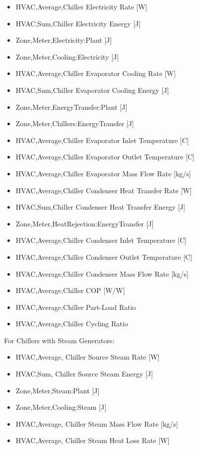 \begin{itemize}
    \item
    HVAC,Average,Chiller Electricity Rate {[}W{]}
    \item
    HVAC,Sum,Chiller Electricity Energy {[}J{]}
    \item
    Zone,Meter,Electricity:Plant {[}J{]}
    \item
    Zone,Meter,Cooling:Electricity {[}J{]}
    \item
    HVAC,Average,Chiller Evaporator Cooling Rate {[}W{]}
    \item
    HVAC,Sum,Chiller Evaporator Cooling Energy {[}J{]}
    \item
    Zone,Meter,EnergyTransfer:Plant {[}J{]}
    \item
    Zone,Meter,Chillers:EnergyTransfer {[}J{]}
    \item
    HVAC,Average,Chiller Evaporator Inlet Temperature {[}C{]}
    \item
    HVAC,Average,Chiller Evaporator Outlet Temperature {[}C{]}
    \item
    HVAC,Average,Chiller Evaporator Mass Flow Rate {[}kg/s{]}
    \item
    HVAC,Average,Chiller Condenser Heat Transfer Rate {[}W{]}
    \item
    HVAC,Sum,Chiller Condenser Heat Transfer Energy {[}J{]}
    \item
    Zone,Meter,HeatRejection:EnergyTransfer {[}J{]}
    \item
    HVAC,Average,Chiller Condenser Inlet Temperature {[}C{]}
    \item
    HVAC,Average,Chiller Condenser Outlet Temperature {[}C{]}
    \item
    HVAC,Average,Chiller Condenser Mass Flow Rate {[}kg/s{]}
    \item
    HVAC,Average,Chiller COP {[}W/W{]}
    \item
    HVAC,Average,Chiller Part-Load Ratio
    \item
    HVAC,Average,Chiller Cycling Ratio
\end{itemize}

For Chillers with Steam Generators:

\begin{itemize}
    \item
    HVAC,Average, Chiller Source Steam Rate {[}W{]}
    \item
    HVAC,Sum, Chiller Source Steam Energy {[}J{]}
    \item
    Zone,Meter,Steam:Plant {[}J{]}
    \item
    Zone,Meter,Cooling:Steam {[}J{]}
    \item
    HVAC,Average, Chiller Steam Mass Flow Rate {[}kg/s{]}
    \item
    HVAC,Average, Chiller Steam Heat Loss Rate {[}W{]}
\end{itemize}

